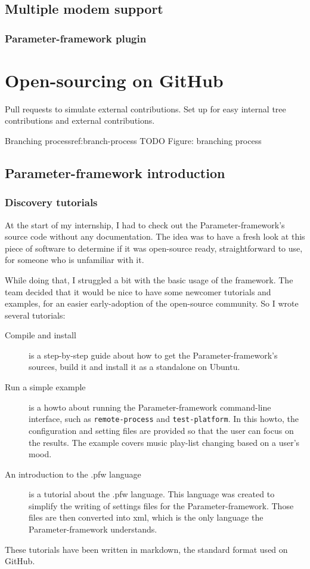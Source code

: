 \subsection{Multiple modem support}
\subsubsection{Parameter-framework plugin}

\section{Open-sourcing on GitHub}
Pull requests to simulate external contributions.
Set up for easy internal tree contributions and external contributions.

\begin{figureGraphics}{Branching process}{ref:branch-process}
    TODO
    Figure: branching process
\end{figureGraphics}


\subsection{Parameter-framework introduction}
\subsubsection{Discovery tutorials}\label{sec:tutorials}

At the start of my internship, I had to check out the Parameter-framework's
source code without any documentation. The idea was to have a fresh look at
this piece of software to determine if it was open-source ready, straightforward
to use, for someone who is unfamiliar with it.

While doing that, I struggled a bit with the basic usage of the framework. The
team decided that it would be nice to have some newcomer tutorials and examples,
for an easier early-adoption of the open-source community. So I wrote several
tutorials:
\begin{description}
    \item[Compile and install]
        is a step-by-step guide about how to get the Parameter-framework's sources,
        build it and install it as a standalone on Ubuntu.
    \item[Run a simple example]
        is a howto about running the Parameter-framework command-line interface,
        such as \lstinline{remote-process} and \lstinline {test-platform}.  In
        this howto, the configuration and setting files are provided so that
        the user can focus on the results. The example covers music play-list
        changing based on a user's mood.
    \item[An introduction to the .pfw language]\label{desc:pfw-language}
        is a tutorial about the .pfw language. This language was
        created to simplify the writing of settings files for the
        Parameter-framework. Those files are then converted into \gls{xml}, which is
        the only language the Parameter-framework understands.
\end{description}
These tutorials have been written in \gls{markdown}, the standard format used
on GitHub.


